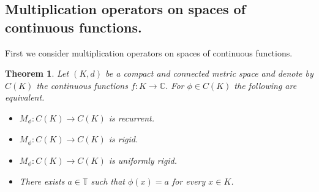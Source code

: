 \documentclass[12pt,leqno]{amsart}
\theoremstyle{plain}
\newtheorem{theorem}[equation]{Theorem}
\theoremstyle{definition}
\numberwithin{equation}{section}
\begin{document}
\subsection{Multiplication operators on spaces of continuous functions.} First we consider multiplication operators on spaces of continuous functions.

\begin{theorem}
	Let $(K,d)$ be a compact and connected metric space and denote by $C(K)$ the continuous functions $f:K\to {\mathbb C}$. For $\phi \in C(K)$ the following are equivalent. 
	\begin{itemize}
		\item[(i)] $M_\phi:C(K)\to C(K)$ is recurrent. 
		\item[(ii)] $M_\phi:C(K)\to C(K)$ is rigid. 
		\item[(iii)] $M_\phi:C(K)\to C(K)$ is uniformly rigid. 
		\item [(iv)] There exists $a\in \mathbb T$ such that $\phi (x)=a$ for every $x\in K$. 
	\end{itemize}
\end{theorem}
\end{document}
